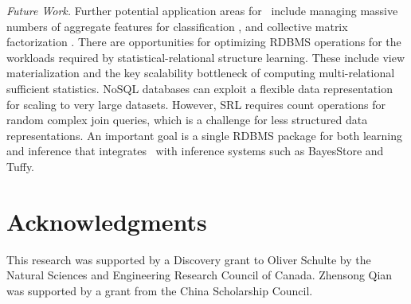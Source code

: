{\em Future Work.} Further potential application areas for \FB\ include managing massive numbers of aggregate features for classification \cite{Popescul2007}, and collective matrix factorization \cite{Singh2008,Singh2013}. 
There are opportunities for optimizing RDBMS operations for the workloads required by statistical-relational structure learning. These include view materialization and the key scalability bottleneck of computing multi-relational sufficient statistics. NoSQL databases can exploit a flexible data representation for scaling to very large datasets. However, SRL requires count operations for random complex join queries, which is a challenge for less structured data representations. An important goal is a single RDBMS package for both learning and inference that integrates \FB\ with inference systems such as BayesStore and Tuffy. 
%


\section{Acknowledgments}
%
This research was supported by a Discovery grant to Oliver Schulte by the Natural Sciences and Engineering Research Council of Canada. 
Zhensong Qian was supported by a grant from the China Scholarship Council.

